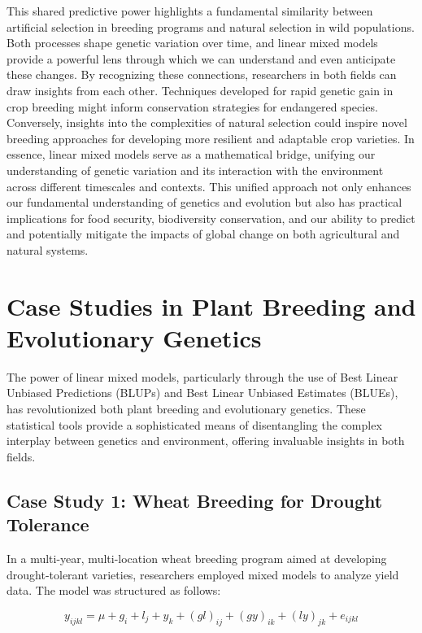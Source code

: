 \documentclass[12pt,a4paper]{article}
\begin{document}
This shared predictive power highlights a fundamental similarity between artificial selection in breeding programs and natural selection in wild populations. Both processes shape genetic variation over time, and linear mixed models provide a powerful lens through which we can understand and even anticipate these changes. By recognizing these connections, researchers in both fields can draw insights from each other. Techniques developed for rapid genetic gain in crop breeding might inform conservation strategies for endangered species. Conversely, insights into the complexities of natural selection could inspire novel breeding approaches for developing more resilient and adaptable crop varieties. In essence, linear mixed models serve as a mathematical bridge, unifying our understanding of genetic variation and its interaction with the environment across different timescales and contexts. This unified approach not only enhances our fundamental understanding of genetics and evolution but also has practical implications for food security, biodiversity conservation, and our ability to predict and potentially mitigate the impacts of global change on both agricultural and natural systems.

\section{Case Studies in Plant Breeding and Evolutionary Genetics}

The power of linear mixed models, particularly through the use of Best Linear Unbiased Predictions (BLUPs) and Best Linear Unbiased Estimates (BLUEs), has revolutionized both plant breeding and evolutionary genetics. These statistical tools provide a sophisticated means of disentangling the complex interplay between genetics and environment, offering invaluable insights in both fields.

\subsection{Case Study 1: Wheat Breeding for Drought Tolerance}

In a multi-year, multi-location wheat breeding program aimed at developing drought-tolerant varieties, researchers employed mixed models to analyze yield data. The model was structured as follows:

\[
y_{ijkl} = \mu + g_i + l_j + y_k + (gl)_{ij} + (gy)_{ik} + (ly)_{jk} + e_{ijkl}
\]
\end{document}
